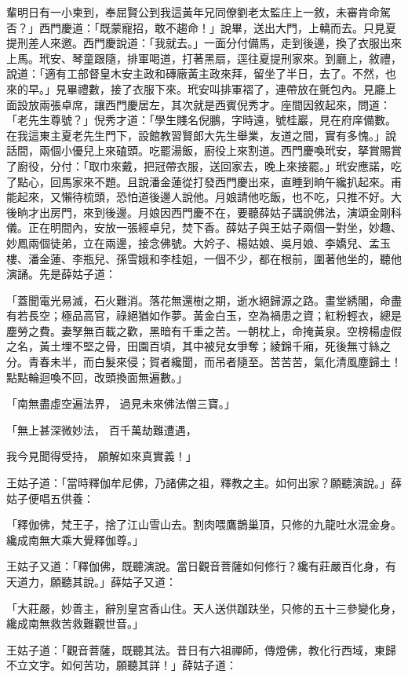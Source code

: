 輩明日有一小柬到，奉屈賢公到我這黃年兄同僚劉老太監庄上一敘，未審肯命駕否？」西門慶道：「既蒙寵招，敢不趨命！」說畢，送出大門，上轎而去。只見夏提刑差人來邀。西門慶說道：「我就去。」一面分付備馬，走到後邊，換了衣服出來上馬。玳安、琴童跟隨，排軍喝道，打著黑扇，逕往夏提刑家來。到廳上，敘禮，說道：「適有工部督皇木安主政和磚廠黃主政來拜，留坐了半日，去了。不然，也來的早。」見畢禮數，接了衣服下來。玳安叫排軍褶了，連帶放在氈包內。見廳上面設放兩張卓席，讓西門慶居左，其次就是西賓倪秀才。座間因敘起來，問道：「老先生尊號？」倪秀才道：「學生賤名倪鵬，字時遠，號桂巖，見在府庠備數。在我這東主夏老先生門下，設館教習賢郎大先生舉業，友道之間，實有多愧。」說話間，兩個小優兒上來磕頭。吃罷湯飯，廚役上來割道。西門慶喚玳安，拏賞賜賞了廚役，分付：「取巾來戴，把冠帶衣服，送回家去，晚上來接罷。」玳安應諾，吃了點心，回馬家來不題。且說潘金蓮從打發西門慶出來，直睡到晌午纔扒起來。甫能起來，又懶待梳頭，恐怕道後邊人說他。月娘請他吃飯，也不吃，只推不好。大後晌才出房門，來到後邊。月娘因西門慶不在，要聽薛姑子講說佛法，演頌金剛科儀。正在明間內，安放一張經卓兒，焚下香。薛姑子與王姑子兩個一對坐，妙趣、妙鳳兩個徒弟，立在兩邊，接念佛號。大妗子、楊姑娘、吳月娘、李嬌兒、孟玉樓、潘金蓮、李瓶兒、孫雪娥和李桂姐，一個不少，都在根前，圍著他坐的，聽他演誦。先是薛姑子道：

「蓋聞電光易滅，石火難消。落花無還樹之期，逝水絕歸源之路。畫堂綉閣，命盡有若長空；極品高官，祿絕猶如作夢。黃金白玉，空為禍患之資；紅粉輕衣，總是塵勞之費。妻孥無百載之歡，黑暗有千重之苦。一朝枕上，命掩黃泉。空榜楊虛假之名，黃土埋不堅之骨，田園百頃，其中被兒女爭奪；綾錦千廂，死後無寸絲之分。青春未半，而白髮來侵；賀者纔聞，而吊者隨至。苦苦苦，氣化清風塵歸土！點點輪迴喚不回，改頭換面無遍數。」

「南無盡虛空遍法界，  過見未來佛法僧三寶。」

「無上甚深微妙法，  百千萬劫難遭遇，

我今見聞得受持，  願解如來真實義！」

王姑子道：「當時釋伽牟尼佛，乃諸佛之祖，釋教之主。如何出家？願聽演說。」薛姑子便唱五供養：

「釋伽佛，梵王子，捨了江山雪山去。割肉喂鷹鵲巢頂，只修的九龍吐水混金身。纔成南無大乘大覺釋伽尊。」

王姑子又道：「釋伽佛，既聽演說。當日觀音菩薩如何修行？纔有莊嚴百化身，有天道力，願聽其說。」薛姑子又道：

「大莊嚴，妙善主，辭別皇宮香山住。天人送供跏趺坐，只修的五十三參變化身，纔成南無救苦救難觀世音。」

王姑子道：「觀音菩薩，既聽其法。昔日有六祖禪師，傳燈佛，教化行西域，東歸不立文字。如何苦功，願聽其詳！」薛姑子道：

